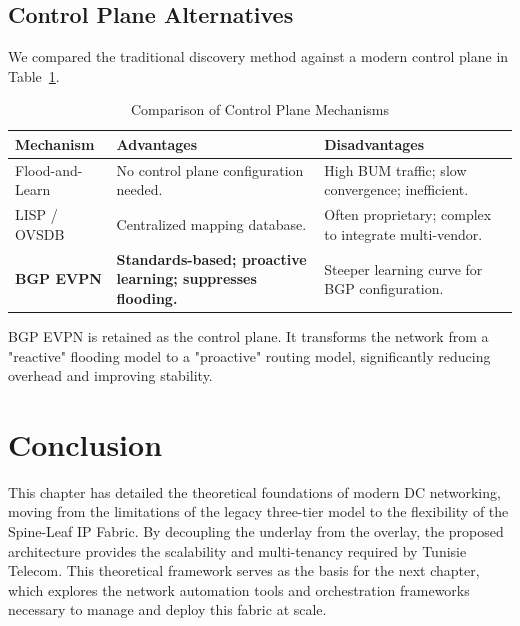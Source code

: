 \subsection*{Control Plane Alternatives}
We compared the traditional discovery method against a modern control plane in Table~\ref{tab:control_plane_comp}.

\begin{table}[!htbp]
    \centering
    \small
    \begin{tabularx}{\textwidth}{l X X}
        \toprule
        \textbf{Mechanism} & \textbf{Advantages} & \textbf{Disadvantages} \\
        \midrule
        Flood-and-Learn & No control plane configuration needed. & High BUM traffic; slow convergence; inefficient. \\
        \midrule
        LISP / OVSDB & Centralized mapping database. & Often proprietary; complex to integrate multi-vendor. \\
        \midrule
        \textbf{BGP EVPN} & \textbf{Standards-based; proactive learning; suppresses flooding.} & Steeper learning curve for BGP configuration. \\
        \bottomrule
\end{tabularx}
\caption{Comparison of Control Plane Mechanisms}
\label{tab:control_plane_comp}
\end{table}
\newpage
BGP EVPN is retained as the control plane. It transforms the network from a "reactive" flooding model to a "proactive" routing model, significantly reducing overhead and improving stability.

\section{Conclusion}
This chapter has detailed the theoretical foundations of modern DC networking, moving from the limitations of the legacy three-tier model to the flexibility of the Spine-Leaf IP Fabric. By decoupling the underlay from the overlay, the proposed architecture provides the scalability and multi-tenancy required by Tunisie Telecom. This theoretical framework serves as the basis for the next chapter, which explores the network automation tools and orchestration frameworks necessary to manage and deploy this fabric at scale.